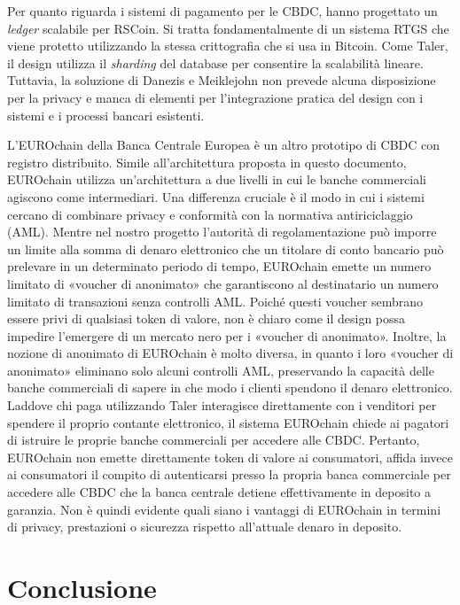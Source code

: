 \documentclass{article}
\begin{document}
Per quanto riguarda i sistemi di pagamento per le CBDC, \cite{Danezis} 
hanno progettato un \textit{ledger} scalabile per RSCoin. Si tratta 
fondamentalmente di un sistema RTGS che viene protetto utilizzando la 
stessa crittografia che si usa in Bitcoin. Come Taler, il design utilizza 
il \textit{sharding} del database per consentire la scalabilità lineare. 
Tuttavia, la soluzione di Danezis e Meiklejohn non prevede alcuna 
disposizione per la privacy e manca di elementi per l'integrazione 
pratica del design con i sistemi e i processi bancari esistenti.

L'EUROchain della Banca Centrale Europea\cite[vedi][]{ECB} è un altro 
prototipo di CBDC con registro distribuito. Simile all'architettura 
proposta in questo documento, EUROchain utilizza un'architettura a due 
livelli in cui le banche commerciali agiscono come intermediari. Una 
differenza cruciale è il modo in cui i sistemi cercano di combinare 
privacy e conformità con la normativa antiriciclaggio (AML). Mentre nel 
nostro progetto l'autorità di regolamentazione può imporre un limite 
alla somma di denaro elettronico che un titolare di conto bancario può 
prelevare in un determinato periodo di tempo, EUROchain emette un numero 
limitato di «voucher di anonimato» che garantiscono al destinatario un 
numero limitato di transazioni senza controlli AML. Poiché questi voucher 
sembrano essere privi di qualsiasi token di valore, non è chiaro come 
il design possa impedire l'emergere di un mercato nero per i «voucher 
di anonimato». Inoltre, la nozione di anonimato di EUROchain è molto 
diversa, in quanto i loro «voucher di anonimato» eliminano solo alcuni 
controlli AML, preservando la capacità delle banche commerciali di 
sapere in che modo i clienti spendono il denaro elettronico. Laddove chi 
paga utilizzando Taler interagisce direttamente con i venditori per 
spendere il proprio contante elettronico, il sistema EUROchain chiede 
ai pagatori di istruire le proprie banche commerciali per accedere alle 
CBDC. Pertanto, EUROchain non emette direttamente token di valore ai 
consumatori, affida invece ai consumatori il compito di autenticarsi 
presso la propria banca commerciale per accedere alle CBDC che la 
banca centrale detiene effettivamente in deposito a garanzia. Non è 
quindi evidente quali siano i vantaggi di EUROchain in termini di 
privacy, prestazioni o sicurezza rispetto all'attuale denaro in deposito.

\section{Conclusione}\label{7.-conclusione}
\end{document}
